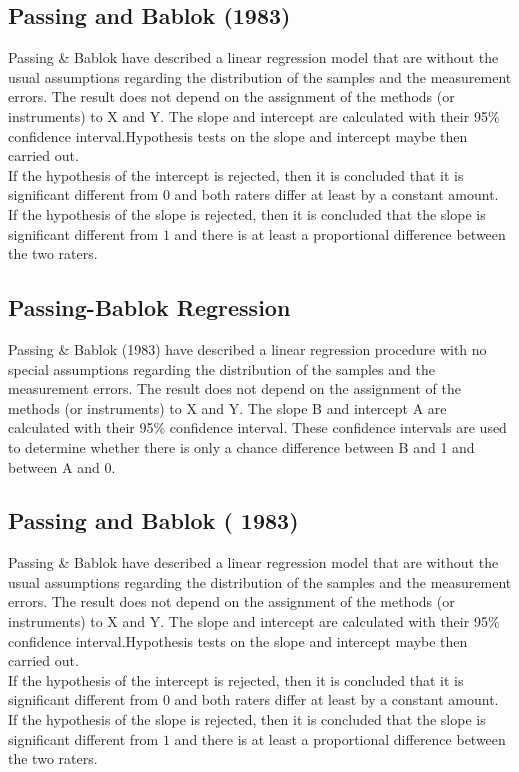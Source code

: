 \documentclass[12pt, a4paper]{report}
\theoremstyle{plain}
\theoremstyle{definition}
\theoremstyle{remark}
\begin{document}
\subsection{Passing and Bablok (1983) }
Passing \& Bablok have described a linear regression model that are without the usual assumptions regarding the distribution of
the samples and the measurement errors. The result does not depend on the assignment of the methods (or instruments) to X and Y. The slope and intercept  are calculated with their 95\% confidence interval.Hypothesis tests on the slope and intercept maybe then
carried out.\\

If the hypothesis of the intercept is rejected, then it is concluded that it is significant different from $0$ and both
raters differ at least by a constant amount.
	\\
If the hypothesis of the slope is rejected, then it is concluded that the slope is significant different from $1$ and there is at
least a proportional difference between the two raters.
\subsection{Passing-Bablok Regression}


Passing \& Bablok (1983) have described a linear regression procedure with no special assumptions regarding the distribution of the samples and the measurement errors. The result does not depend on the assignment of the methods (or instruments) to X and Y. The slope B and intercept A are calculated with their 95\% confidence interval. These confidence intervals are used to determine whether there is only a chance difference between B and 1 and between A and 0.


\subsection{Passing and Bablok ( 1983) }
Passing \& Bablok have described a linear regression model that are without the usual assumptions regarding the distribution of
the samples and the measurement errors. The result does not depend on the assignment of the methods (or instruments) to X and Y. The
slope and intercept  are calculated with their 95\% confidence interval.Hypothesis tests on the slope and intercept maybe then
carried out.
\\
If the hypothesis of the intercept is rejected, then it is concluded that it is significant different from $0$ and both
raters differ at least by a constant amount.
\\
If the hypothesis of the slope is rejected, then it is concluded that the slope is significant different from $1$ and there is at
least a proportional difference between the two raters.
\end{document}
